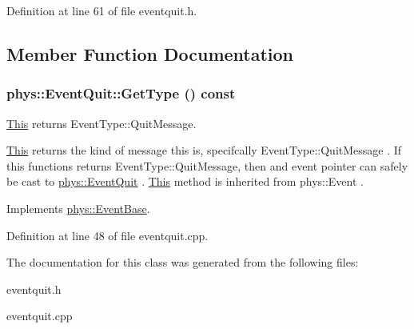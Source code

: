 Definition at line 61 of file eventquit.h.



\subsection{Member Function Documentation}
\hypertarget{classphys_1_1EventQuit_a3bfca875349e73dbda47c3c62a253e3b}{
\subsubsection[{GetType}]{ phys::EventQuit::GetType () const}}
\label{dd/dea/classphys_1_1EventQuit_a3bfca875349e73dbda47c3c62a253e3b}


\hyperlink{structThis}{This} returns EventType::QuitMessage. 

\hyperlink{structThis}{This} returns the kind of message this is, specifcally EventType::QuitMessage . If this functions returns EventType::QuitMessage, then and event pointer can safely be cast to \hyperlink{classphys_1_1EventQuit}{phys::EventQuit} . \hyperlink{structThis}{This} method is inherited from phys::Event . 

Implements \hyperlink{classphys_1_1EventBase_a1b3d29b6ecf30f18cc3e1825a515c508}{phys::EventBase}.



Definition at line 48 of file eventquit.cpp.



The documentation for this class was generated from the following files:\begin{DoxyCompactItemize}
\item 
eventquit.h\item 
eventquit.cpp\end{DoxyCompactItemize}
